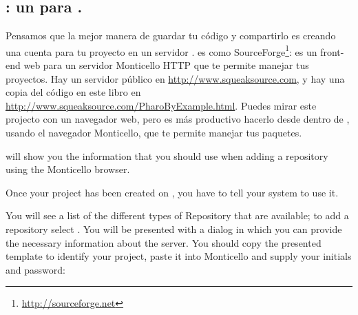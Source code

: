 \documentclass[a4paper,10pt,twoside]{book}
\begin{document}
{{%

\subsection{\ind{\sqsrc}: un  para \pharo.} 

Pensamos que la mejor manera de guardar tu c\'odigo y compartirlo es creando una cuenta para tu proyecto en un servidor \sqsrc. \sqsrc es como SourceForge\footnote{\url{http://sourceforge.net}}: es un front-end web para un servidor Monticello HTTP que te permite manejar tus proyectos.
Hay un servidor \sqsrc p\'ublico en \url{http://www.squeaksource.com}, y hay una copia del c\'odigo en este libro en \url{http://www.squeaksource.com/PharoByExample.html}. Puedes mirar este projecto con un navegador web, pero es m\'as productivo hacerlo desde dentro de \pharo, usando el navegador Monticello, que te permite manejar tus paquetes.


\sqsrc will show you the information that you should use when adding a repository using the Monticello browser. 

Once your project has been created on \sqsrc, you have to tell your \pharo system to use it. 

  You will see a list of the different types of Repository that are available; to add a \sqsrc repository select . You will be presented with a dialog in which you can provide the necessary information about the server.
You should copy the presented template to identify your \sqsrc project, paste it into Monticello and supply your initials and password:

}}
\end{document}
